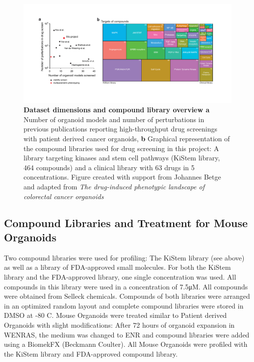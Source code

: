 \begin{flushleft}
\begin{figure}[h]
\centering
\includegraphics[width=\textwidth,
                height=\textheight,
                keepaspectratio]{figures/promise/pdf/fig_1_3.pdf}
\caption[Dataset dimensions and compound library overview]{\textbf{Dataset dimensions and compound library overview a} Number of organoid models and number of perturbations in previous publications reporting high-throughput drug screenings with patient derived cancer organoids, \textbf{b} Graphical representation of the compound libraries used for drug screening in this project: A library targeting kinases and stem cell pathways (KiStem library, 464 compounds) and a clinical library with 63 drugs in 5 concentrations. Figure created with support from Johannes Betge and adapted from \textit{The drug-induced phenotypic landscape of colorectal cancer organoids} \parencite{betgeDruginducedPhenotypicLandscape2022}}
\label{fig_137}
\end{figure}

\subsection{Compound Libraries and Treatment for Mouse Organoids}
Two compound libraries were used for profiling: The KiStem library (see above) as well as a library of FDA-approved small molecules. For both the KiStem library and the FDA-approved library, one single concentration was used. All compounds in this library were used in a concentration of 7.5μM. All compounds were obtained from Selleck chemicals. Compounds of both libraries were arranged in an optimized random layout and complete compound libraries were stored in DMSO at -80 C.
\bigbreak
Mouse Organoids were treated similar to Patient derived Organoids with slight modifications: After 72 hours of organoid expansion in WENRAS, the medium was changed to ENR and compound libraries were added using a BiomekFX (Beckmann Coulter). All Mouse Organoids were profiled with the KiStem library and FDA-approved compound library.


\end{flushleft}
